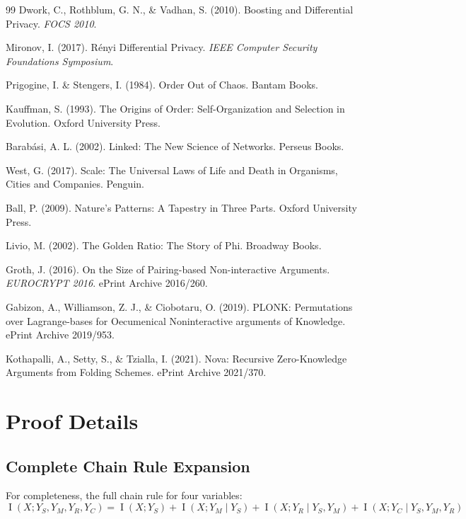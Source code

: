 \documentclass[11pt,a4paper]{article}
\theoremstyle{definition}
\DeclareMathOperator{\I}{I}
\newcommand{\given}{\mid}
\begin{document}
\begin{thebibliography}{99}
Dwork, C., Rothblum, G. N., \& Vadhan, S. (2010). Boosting and Differential Privacy. \textit{FOCS 2010}.

Mironov, I. (2017). Rényi Differential Privacy. \textit{IEEE Computer Security Foundations Symposium}.

Prigogine, I. \& Stengers, I. (1984). Order Out of Chaos. Bantam Books.

Kauffman, S. (1993). The Origins of Order: Self-Organization and Selection in Evolution. Oxford University Press.

Barabási, A. L. (2002). Linked: The New Science of Networks. Perseus Books.

West, G. (2017). Scale: The Universal Laws of Life and Death in Organisms, Cities and Companies. Penguin.

Ball, P. (2009). Nature's Patterns: A Tapestry in Three Parts. Oxford University Press.

Livio, M. (2002). The Golden Ratio: The Story of Phi. Broadway Books.

Groth, J. (2016). On the Size of Pairing-based Non-interactive Arguments. \textit{EUROCRYPT 2016}. ePrint Archive 2016/260.

Gabizon, A., Williamson, Z. J., \& Ciobotaru, O. (2019). PLONK: Permutations over Lagrange-bases for Oecumenical Noninteractive arguments of Knowledge. ePrint Archive 2019/953.

Kothapalli, A., Setty, S., \& Tzialla, I. (2021). Nova: Recursive Zero-Knowledge Arguments from Folding Schemes. ePrint Archive 2021/370.

\end{thebibliography}

\appendix

\section{Proof Details}

\subsection{Complete Chain Rule Expansion}

For completeness, the full chain rule for four variables:
\[
\I(X; Y_S, Y_M, Y_R, Y_C) = \I(X; Y_S) + \I(X; Y_M \given Y_S) + \I(X; Y_R \given Y_S, Y_M) + \I(X; Y_C \given Y_S, Y_M, Y_R)
\]
\end{document}
